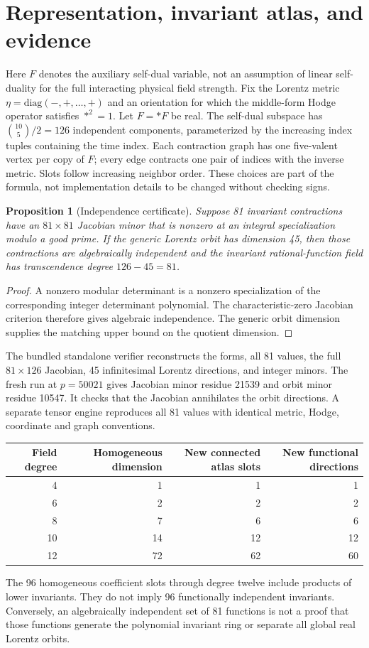 \documentclass[11pt]{article}
\newtheorem{proposition}[theorem]{Proposition}
\begin{document}
\section{Representation, invariant atlas, and evidence}
Here $F$ denotes the auxiliary self-dual variable, not an assumption of linear
self-duality for the full interacting physical field strength.
Fix the Lorentz metric $\eta=\mathrm{diag}(-,+,\ldots,+)$ and an orientation for
which the middle-form Hodge operator satisfies $*^2=1$. Let $F=*F$ be real.
The self-dual subspace has $\binom{10}{5}/2=126$ independent components,
parameterized by the increasing index tuples containing the time index.
Each contraction graph has one five-valent vertex per copy of $F$; every edge
contracts one pair of indices with the inverse metric. Slots follow increasing
neighbor order. These choices are part of the formula, not implementation details
to be changed without checking signs.

\begin{proposition}[Independence certificate]
Suppose 81 invariant contractions have an $81\times81$ Jacobian minor that
is nonzero at an integral specialization modulo a good prime. If the generic
Lorentz orbit has dimension 45, then those contractions are algebraically
independent and the invariant rational-function field has transcendence degree
$126-45=81$.
\end{proposition}
\begin{proof}
A nonzero modular determinant is a nonzero specialization of the corresponding
integer determinant polynomial. The characteristic-zero Jacobian criterion
therefore gives algebraic independence. The generic orbit dimension supplies
the matching upper bound on the quotient dimension.
\end{proof}

The bundled standalone verifier reconstructs the forms, all 81 values, the full
$81\times126$ Jacobian, 45 infinitesimal Lorentz directions, and integer minors.
The fresh run at $p=50021$ gives Jacobian minor residue 21539 and orbit minor
residue 10547. It checks that the Jacobian annihilates the orbit directions.
A separate tensor engine reproduces all 81 values with identical metric, Hodge,
coordinate and graph conventions.

\begin{center}
\begin{tabular}{rrrr}
\toprule
Field degree & Homogeneous dimension & New connected atlas slots & New functional directions\\
\midrule
4 & 1 & 1 & 1\\
6 & 2 & 2 & 2\\
8 & 7 & 6 & 6\\
10 & 14 & 12 & 12\\
12 & 72 & 62 & 60\\
\bottomrule
\end{tabular}
\end{center}
The 96 homogeneous coefficient slots through degree twelve include products
of lower invariants. They do not imply 96 functionally independent invariants.
Conversely, an algebraically independent set of 81 functions is not a proof
that those functions generate the polynomial invariant ring or separate all
global real Lorentz orbits.
\end{document}
